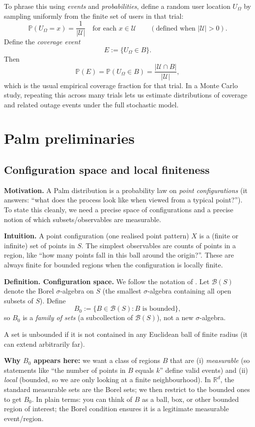To phrase this using \emph{events} and \emph{probabilities}, define a random user location $U_{\Omega}$ by sampling
uniformly from the finite set of users in that trial:
$$
\mathbb{P}(U_{\Omega}=x)=\frac{1}{|\mathcal{U}|}\quad\text{for each }x\in \mathcal{U}\qquad (\text{defined when }|\mathcal{U}|>0).
$$
Define the \emph{coverage event}
$$
E := \{U_{\Omega}\in B\}.
$$
Then
$$
\mathbb{P}(E)=\mathbb{P}(U_{\Omega}\in B)=\frac{|\mathcal{U}\cap B|}{|\mathcal{U}|},
$$
which is the usual empirical coverage fraction for that trial. In a Monte Carlo study, repeating this across many trials
lets us estimate distributions of coverage and related outage events under the full stochastic model.

\section{Palm preliminaries}

\subsection{Configuration space and local finiteness}

\noindent\textbf{Motivation.}
A Palm distribution is a probability law on \emph{point configurations} (it answers: ``what does the
process look like when viewed from a typical point?''). To state this cleanly, we need a precise space of
configurations and a precise notion of which subsets/observables are measurable.

\noindent\textbf{Intuition.}
A point configuration (one realised point pattern) $X$ is a (finite or infinite) set of points in $S$. The simplest observables
are counts of points in a region, like ``how many points fall in this ball around the origin?''. These are always finite
for bounded regions when the configuration is locally finite.

\noindent\textbf{Definition. Configuration space.}
We follow the notation of \cite{coeurjolly2017palm}.
Let $\mathcal{B}(S)$ denote the Borel $\sigma$-algebra on $S$ (the smallest $\sigma$-algebra containing all open subsets of $S$).
Define
$$
B_0 := \{B\in \mathcal{B}(S) : B \text{ is bounded}\},
$$
so $B_0$ is a \emph{family of sets} (a subcollection of $\mathcal{B}(S)$), not a new $\sigma$-algebra.

A set is unbounded if it is not contained in any Euclidean ball of finite radius (it can extend arbitrarily far).

\noindent\textbf{Why $B_0$ appears here:} we want a class of regions $B$ that are
(i) \emph{measurable} (so statements like ``the number of points in $B$ equals $k$'' define valid events) and
(ii) \emph{local} (bounded, so we are only looking at a finite neighbourhood).
\newline In $\mathbb{R}^d$, the standard measurable sets are the Borel sets; we then restrict to the bounded ones to get $B_0$.
\newline In plain terms: you can think of $B$ as a ball, box, or other bounded region of interest; the Borel condition 
ensures it is a legitimate measurable event/region.

